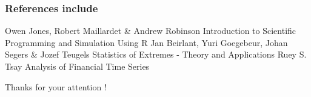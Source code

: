 \documentclass{beamer}
\begin{document}




\begin{frame}
\frametitle{References include}
\footnotesize{
\begin{thebibliography}{99} %
 Owen Jones, Robert Maillardet \& Andrew Robinson
\newblock Introduction to Scientific Programming and Simulation Using R
 Jan Beirlant, Yuri Goegebeur, Johan Segers \& Jozef Teugels
\newblock Statistics of Extremes - Theory and Applications
 Ruey S. Tsay 
\newblock Analysis of Financial Time Series
\end{thebibliography}
}
\end{frame}


\begin{frame}
\Huge{\centerline{Thanks for your attention ! }}
\end{frame}

\end{document}
